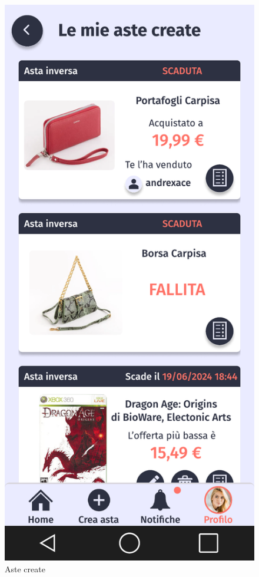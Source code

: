 \begin{figure}[!htb]
\begin{minipage}{0.32\textwidth}
            \includegraphics[width=.7\linewidth]{Immagini/Frames/Compratore/C13.pdf}
            \caption{Aste create}
        \end{minipage}\hfill
    \end{figure}

